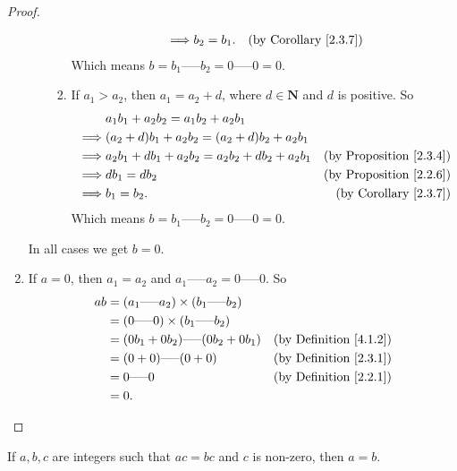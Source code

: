 \begin{proof}
\begin{enumerate}
\begin{enumerate}[label=(\roman*)]
\begin{enumerate}[label=(\arabic*)]
\begin{align*}
                            \implies & b_2 = b_1. & \text{(by Corollary \ref{2.3.7})}
                        \end{align*}
                    Which means \(b = b_1 \text{-----} b_2 = 0 \text{-----} 0 = 0\).
                    \item If \(a_1 > a_2\), then \(a_1 = a_2 + d\), where \(d \in \mathbf{N}\) and \(d\) is positive.
                    So
                        \begin{align*}
                            & a_1b_1 + a_2b_2 = a_1b_2 + a_2b_1 \\
                            \implies & (a_2 + d)b_1 + a_2b_2 = (a_2 + d)b_2 + a_2b_1 \\
                            \implies & a_2b_1 + db_1 + a_2b_2 = a_2b_2 + db_2 + a_2b_1 & \text{(by Proposition \ref{2.3.4})} \\
                            \implies & db_1 = db_2 & \text{(by Proposition \ref{2.2.6})} \\
                            \implies & b_1 = b_2. & \text{(by Corollary \ref{2.3.7})}
                        \end{align*}
                    Which means \(b = b_1 \text{-----} b_2 = 0 \text{-----} 0 = 0\).
                \end{enumerate}
            \end{enumerate}
        In all cases we get \(b = 0\).
        \item If \(a = 0\), then \(a_1 = a_2\) and \(a_1 \text{-----} a_2 = 0 \text{-----} 0\).
        So
        \begin{align*}
            ab &= (a_1 \text{-----} a_2) \times (b_1 \text{-----} b_2) \\
            &= (0 \text{-----} 0) \times (b_1 \text{-----} b_2) \\
            &= (0b_1 + 0b_2) \text{-----} (0b_2 + 0b_1) & \text{(by Definition \ref{4.1.2})} \\
            &= (0 + 0) \text{-----} (0 + 0) & \text{(by Definition \ref{2.3.1})} \\
            &= 0 \text{-----} 0 & \text{(by Definition \ref{2.2.1})} \\
            &= 0.
        \end{align*}
    \end{enumerate}
\end{proof}

\begin{corollary}\label{4.1.9}
If \(a, b, c\) are integers such that \(ac = bc\) and \(c\) is non-zero, then \(a = b\).
\end{corollary}

